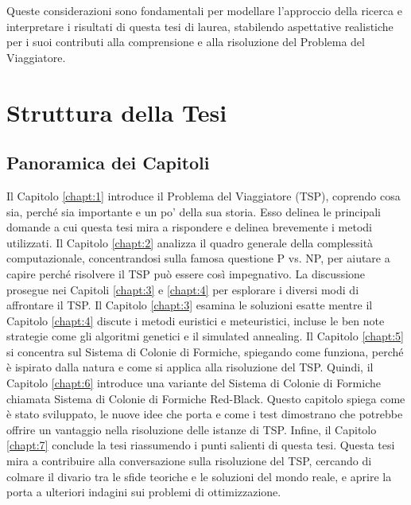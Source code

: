 Queste considerazioni sono fondamentali per modellare l'approccio della ricerca e interpretare i risultati di questa tesi di laurea, stabilendo aspettative realistiche per i suoi contributi alla comprensione e alla risoluzione del Problema del Viaggiatore.

\section{Struttura della Tesi}

\subsection{Panoramica dei Capitoli}
Il Capitolo \ref{chapt:1}
introduce il Problema del Viaggiatore (TSP), coprendo cosa sia, perché sia importante e un po' della sua storia. Esso delinea le principali domande a cui questa tesi mira a rispondere e delinea brevemente i metodi utilizzati.
Il Capitolo \ref{chapt:2}
analizza il quadro generale della complessità computazionale, concentrandosi sulla famosa questione P vs. NP, per aiutare a capire perché risolvere il \gls{TSP} può essere così impegnativo.
La discussione prosegue nei Capitoli \ref{chapt:3} e \ref{chapt:4} per esplorare i diversi modi di affrontare il \gls{TSP}.  Il Capitolo \ref{chapt:3} esamina le soluzioni esatte mentre il Capitolo \ref{chapt:4} discute i metodi euristici e meteuristici, incluse le ben note strategie come gli algoritmi genetici e il simulated annealing.
Il Capitolo \ref{chapt:5} si concentra sul Sistema di Colonie di Formiche, spiegando come funziona, perché è ispirato dalla natura e come si applica alla risoluzione del \gls{TSP}.
Quindi, il Capitolo \ref{chapt:6} introduce una variante del Sistema di Colonie di Formiche chiamata Sistema di Colonie di Formiche Red-Black. Questo capitolo spiega come è stato sviluppato, le nuove idee che porta e come i test dimostrano che potrebbe offrire un vantaggio nella risoluzione delle istanze di \gls{TSP}.
Infine, il Capitolo \ref{chapt:7} conclude la tesi riassumendo i punti salienti di questa tesi.
Questa tesi mira a contribuire alla conversazione sulla risoluzione del \gls{TSP}, cercando di colmare il divario tra le sfide teoriche e le soluzioni del mondo reale, e aprire la porta a ulteriori indagini sui problemi di ottimizzazione.
